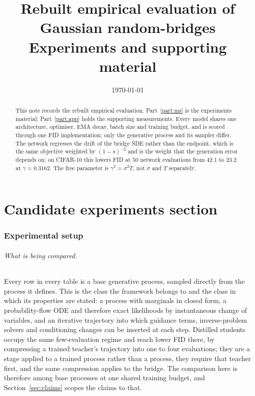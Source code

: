 \documentclass[11pt,a4paper]{article}
\title{Rebuilt empirical evaluation of Gaussian random-bridges\\
\large Experiments and supporting material}
\author{}
\date{\today}
\begin{document}
\maketitle

\begin{abstract}
\noindent
This note records the rebuilt empirical evaluation. Part~\ref{part:ms} is the
experiments material; Part~\ref{part:app} holds the supporting measurements.
Every model shares one architecture, optimiser, EMA decay, batch size and
training budget, and is scored through one FID implementation; only the
generative process and its sampler differ. The network regresses the drift of
the bridge SDE rather than the endpoint, which is the same objective weighted by
$(1-s)^{-2}$ and is the weight that the generation error depends on; on CIFAR-10
this lowers FID at $50$ network evaluations from $42.1$ to $23.2$ at
$\gamma=0.3162$. The free parameter is $\gamma^2=\sigma^2T$, not $\sigma$ and
$T$ separately.
\end{abstract}

\tableofcontents

\part{Candidate experiments section}
\label{part:ms}

\section{Experimental setup}
\label{sec:setup}

\paragraph{What is being compared.} Every row in every table is a base
generative process, sampled directly from the process it defines. This is the
class the framework belongs to and the class in which its properties are stated:
a process with marginals in closed form, a probability-flow ODE and therefore
exact likelihoods by instantaneous change of variables, and an iterative
trajectory into which guidance terms, inverse-problem solvers and conditioning
changes can be inserted at each step. Distilled students occupy the same
few-evaluation regime and reach lower FID there, by compressing a trained
teacher's trajectory into one to four evaluations; they are a stage applied to a
trained process rather than a process, they require that teacher first, and the
same compression applies to the bridge. The comparison here is therefore among
base processes at one shared training budget, and
Section~\ref{sec:claims} scopes the claims to that.
\end{document}
